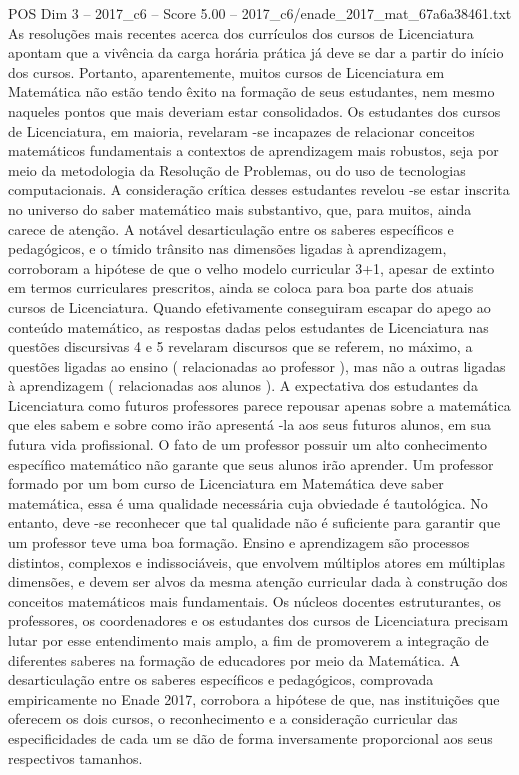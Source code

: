 \begin{textsample}{POS Dim 3 – 2017\_c6 – Score 5.00 – 2017\_c6/enade\_2017\_mat\_67a6a38461.txt}
As resoluções mais recentes acerca dos currículos dos cursos de Licenciatura apontam que a vivência da carga horária prática já deve se dar a partir do início dos cursos.
Portanto, aparentemente, muitos cursos de Licenciatura em Matemática não estão tendo êxito na formação de seus estudantes, nem mesmo naqueles pontos que mais deveriam estar consolidados.
Os estudantes dos cursos de Licenciatura, em maioria, revelaram -se incapazes de relacionar conceitos matemáticos fundamentais a contextos de aprendizagem mais robustos, seja por meio da metodologia da Resolução de Problemas, ou do uso de tecnologias computacionais.
A consideração crítica desses estudantes revelou -se estar inscrita no universo do saber matemático mais substantivo, que, para muitos, ainda carece de atenção.
A notável desarticulação entre os saberes específicos e pedagógicos, e o tímido trânsito nas dimensões ligadas à aprendizagem, corroboram a hipótese de que o velho modelo curricular 3+1, apesar de extinto em termos curriculares prescritos, ainda se coloca para boa parte dos atuais cursos de Licenciatura.
Quando efetivamente conseguiram escapar do apego ao conteúdo matemático, as respostas dadas pelos estudantes de Licenciatura nas questões discursivas 4 e 5 revelaram discursos que se referem, no máximo, a questões ligadas ao ensino ( relacionadas ao professor ), mas não a outras ligadas à aprendizagem ( relacionadas aos alunos ).
A expectativa dos estudantes da Licenciatura como futuros professores parece repousar apenas sobre a matemática que eles sabem e sobre como irão apresentá -la aos seus futuros alunos, em sua futura vida profissional.
O fato de um professor possuir um alto conhecimento específico matemático não garante que seus alunos irão aprender.
Um professor formado por um bom curso de Licenciatura em Matemática deve saber matemática, essa é uma qualidade necessária cuja obviedade é tautológica.
No entanto, deve -se reconhecer que tal qualidade não é suficiente para garantir que um professor teve uma boa formação.
Ensino e aprendizagem são processos distintos, complexos e indissociáveis, que envolvem múltiplos atores em múltiplas dimensões, e devem ser alvos da mesma atenção curricular dada à construção dos conceitos matemáticos mais fundamentais.
Os núcleos docentes estruturantes, os professores, os coordenadores e os estudantes dos cursos de Licenciatura precisam lutar por esse entendimento mais amplo, a fim de promoverem a integração de diferentes saberes na formação de educadores por meio da Matemática.
A desarticulação entre os saberes específicos e pedagógicos, comprovada empiricamente no Enade 2017, corrobora a hipótese de que, nas instituições que oferecem os dois cursos, o reconhecimento e a consideração curricular das especificidades de cada um se dão de forma inversamente proporcional aos seus respectivos tamanhos.

\end{textsample}
